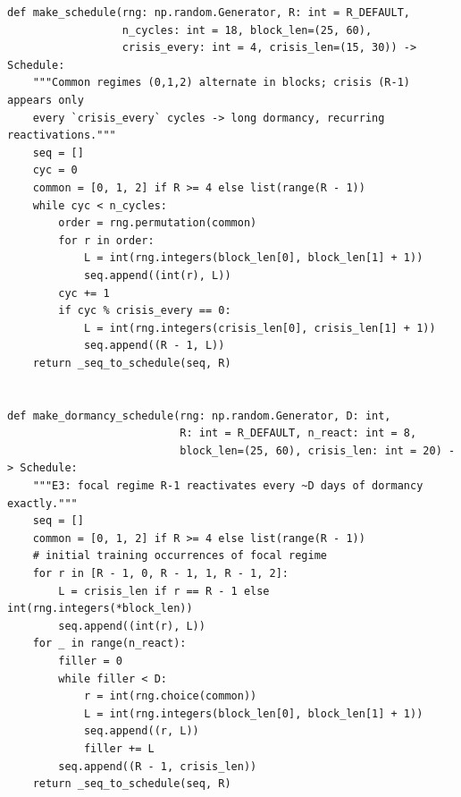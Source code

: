 \begin{lstlisting}[caption={Schedule builders and dormancy bookkeeping (\texttt{risp.py}).},label={lst:dd6-sched}]
def make_schedule(rng: np.random.Generator, R: int = R_DEFAULT,
                  n_cycles: int = 18, block_len=(25, 60),
                  crisis_every: int = 4, crisis_len=(15, 30)) -> Schedule:
    """Common regimes (0,1,2) alternate in blocks; crisis (R-1) appears only
    every `crisis_every` cycles -> long dormancy, recurring reactivations."""
    seq = []
    cyc = 0
    common = [0, 1, 2] if R >= 4 else list(range(R - 1))
    while cyc < n_cycles:
        order = rng.permutation(common)
        for r in order:
            L = int(rng.integers(block_len[0], block_len[1] + 1))
            seq.append((int(r), L))
        cyc += 1
        if cyc % crisis_every == 0:
            L = int(rng.integers(crisis_len[0], crisis_len[1] + 1))
            seq.append((R - 1, L))
    return _seq_to_schedule(seq, R)


def make_dormancy_schedule(rng: np.random.Generator, D: int,
                           R: int = R_DEFAULT, n_react: int = 8,
                           block_len=(25, 60), crisis_len: int = 20) -> Schedule:
    """E3: focal regime R-1 reactivates every ~D days of dormancy exactly."""
    seq = []
    common = [0, 1, 2] if R >= 4 else list(range(R - 1))
    # initial training occurrences of focal regime
    for r in [R - 1, 0, R - 1, 1, R - 1, 2]:
        L = crisis_len if r == R - 1 else int(rng.integers(*block_len))
        seq.append((int(r), L))
    for _ in range(n_react):
        filler = 0
        while filler < D:
            r = int(rng.choice(common))
            L = int(rng.integers(block_len[0], block_len[1] + 1))
            seq.append((r, L))
            filler += L
        seq.append((R - 1, crisis_len))
    return _seq_to_schedule(seq, R)
\end{lstlisting}

